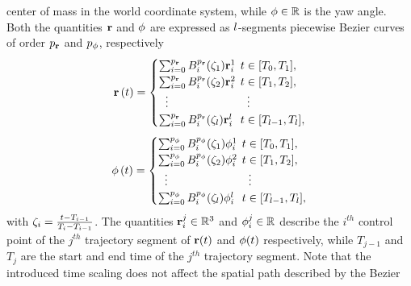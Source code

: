 center of mass in the world coordinate system, while $\phi \in \mathbb{R}$ is the yaw angle. Both the quantities $\mathbf{r}$ and $\phi$ are expressed as
$l$-segments piecewise B\acuteacc ezier curves of order $p_{\mathbf{r}}$ and $p_{\phi}$, respectively
\begin{equation*}
	\rr \lp t \rp=
	\begin{cases}
		\sum_{i=0}^{\order_{\rr}} \basis_i^{\order_{\rr}}(\clock_1) \rr^1_i & \hspace{-0.2cm} t \in [T_0, T_1],\\
		\sum_{i=0}^{\order_{\rr}} \basis_i^{\order_{\rr}}(\clock_2) \rr^2_i & \hspace{-0.2cm} t \in [T_1, T_2],\\
		\hspace{0.2cm} \vdots & \vdots \\
		\sum_{i=0}^{\order_{\rr}} \basis_i^{\order_{\rr}}(\clock_{\segnumber}) \rr^{\segnumber}_i & \hspace{-0.2cm} t \in [T_{\segnumber-1}, T_{\segnumber}],\\
	\end{cases}
\end{equation*}
\begin{equation*}
	\yaw \lp t \rp=
	\begin{cases}
		\sum_{i=0}^{\order_{\yaw}} \basis_i^{\order_{\yaw}}(\clock_1) \yaw^1_i & \hspace{-0.2cm} t \in [T_0, T_1],\\
		\sum_{i=0}^{\order_{\yaw}} \basis_i^{\order_{\yaw}}(\clock_2) \yaw^2_i & \hspace{-0.2cm} t \in [T_1, T_2],\\
		\hspace{0.2cm} \vdots & \vdots \\
		\sum_{i=0}^{\order_{\yaw}} \basis_i^{\order_{\yaw}}(\clock_{\segnumber}) \yaw^{\segnumber}_i & \hspace{-0.2cm} t \in [T_{\segnumber-1}, T_{\segnumber}],\\
	\end{cases}
\end{equation*}
with $\zeta_i = \frac{t-T_{i-1}}{T_{i}-T_{i-1}}$. The quantities $\mathbf{r}_i^j \in \mathbb{R}^3$ and $\phi_i^j \in \mathbb{R}$ describe the $i^{th}$ control
point of the $j^{th}$ trajectory segment of $\mathbf{r}(t)$ and $\phi(t)$ respectively, while $T_{j-1}$ and $ T_j$ are the start and end time of
the $j^{th}$ trajectory segment. Note that the introduced time scaling does not affect the spatial path described by the B\acuteacc ezier
